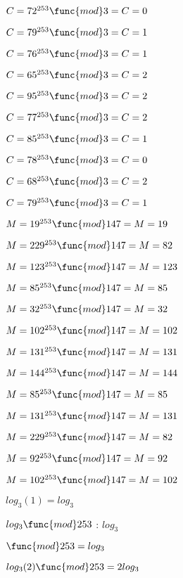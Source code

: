 \documentclass{article}
\begin{document}
$C=72^{253}\func{mod}3=\allowbreak C=0$

$C=79^{253}\func{mod}3=\allowbreak C=1$

$C=76^{253}\func{mod}3=\allowbreak C=1$

$C=65^{253}\func{mod}3=\allowbreak C=2$

$C=95^{253}\func{mod}3=\allowbreak C=2$

$C=77^{253}\func{mod}3=\allowbreak C=2$

$C=85^{253}\func{mod}3=\allowbreak C=1$

$C=78^{253}\func{mod}3=\allowbreak C=0$

$C=68^{253}\func{mod}3=\allowbreak C=2$

$C=79^{253}\func{mod}3=\allowbreak C=1$

\vspace{1pt}

$M=19^{253}\func{mod}147=\allowbreak M=19$

$M=229^{253}\func{mod}147=\allowbreak M=82$

$M=123^{253}\func{mod}147=\allowbreak M=123$

$M=85^{253}\func{mod}147=\allowbreak M=85$

$M=32^{253}\func{mod}147=\allowbreak M=32$

$M=102^{253}\func{mod}147=\allowbreak M=102$

$M=131^{253}\func{mod}147=\allowbreak M=131$

$M=144^{253}\func{mod}147=\allowbreak M=144$

$M=85^{253}\func{mod}147=\allowbreak M=85$

$M=131^{253}\func{mod}147=\allowbreak M=131$

$M=229^{253}\func{mod}147=\allowbreak M=82$

$M=92^{253}\func{mod}147=\allowbreak M=92$

$M=102^{253}\func{mod}147=\allowbreak M=102$

\vspace{1pt}

\vspace{1pt}

$log_{3}(1)=\allowbreak log_{3}$

$\vspace{1pt}log_{3}\func{mod}253$ : $log_{3}$ 

$\func{mod}253=\allowbreak log_{3}$

$log_{3}(2)\func{mod}253=\allowbreak 2log_{3}$

\vspace{1pt}
\end{document}
